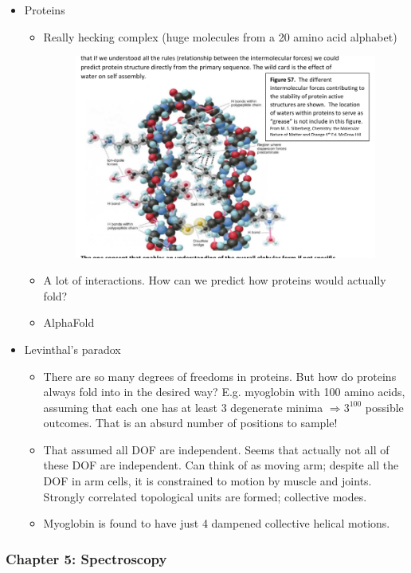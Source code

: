 \documentclass[10pt]{article}
\begin{document}
\begin{itemize}
\item Proteins
\begin{itemize}
	\item Really hecking complex (huge molecules from a 20 amino acid alphabet)
		\begin{figure}[H]
			\centering
			\includegraphics[width=0.8\linewidth]{img/image_2022-04-19-13-27-12.png}
		\end{figure}
	\item A lot of interactions. How can we predict how proteins would actually fold?
	\item AlphaFold
\end{itemize}

\item Levinthal's paradox
\begin{itemize}
	\item There are so many degrees of freedoms in proteins. But how do proteins always fold into in the desired way? E.g. myoglobin with 100 amino acids, assuming that each one has at least 3 degenerate minima $ \Rightarrow 3^{100} $ possible outcomes. That is an absurd number of positions to sample!
	\item That assumed all DOF are independent. Seems that actually not all of these DOF are independent. Can think of as moving arm; despite all the DOF in arm cells, it is constrained to motion by muscle and joints. Strongly correlated topological units are formed; collective modes.
	\item Myoglobin is found to have just 4 dampened collective helical motions.
\end{itemize}
\end{itemize}


\subsubsection{Chapter 5: Spectroscopy}
\end{document}

